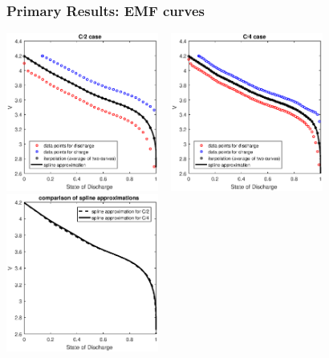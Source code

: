 \documentclass{beamer}
\begin{document}
\begin{frame}
  \frametitle{Primary Results: EMF curves}
  \centering
\includegraphics[width=5cm]{HRP_C2.eps}
~
\includegraphics[width=5cm]{HRP_C4.eps}\\
\includegraphics[width=5cm]{HRP_C2andC4_spline_comparison.eps}
\end{frame}
\end{document}
